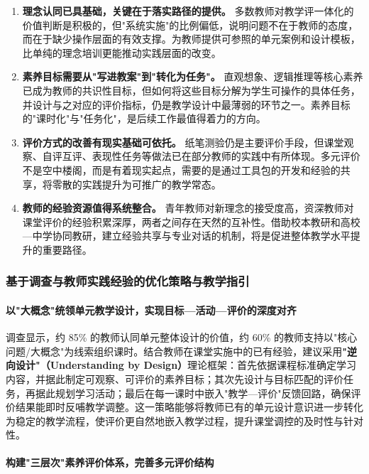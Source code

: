 \documentclass[UTF8,a4paper,12pt,twoside]{ctexart}
\begin{document}
\begin{enumerate}
\item \textbf{理念认同已具基础，关键在于落实路径的提供。} 多数教师对教学评一体化的价值判断是积极的，但"系统实施"的比例偏低，说明问题不在于教师的态度，而在于缺少操作层面的有效支撑。为教师提供可参照的单元案例和设计模板，比单纯的理念培训更能推动实践层面的改变。
\item \textbf{素养目标需要从"写进教案"到"转化为任务"。} 直观想象、逻辑推理等核心素养已成为教师的共识性目标，但如何将这些目标分解为学生可操作的具体任务，并设计与之对应的评价指标，仍是教学设计中最薄弱的环节之一。素养目标的"课时化"与"任务化"，是后续工作最值得着力的方向。
\item \textbf{评价方式的改善有现实基础可依托。} 纸笔测验仍是主要评价手段，但课堂观察、自评互评、表现性任务等做法已在部分教师的实践中有所体现。多元评价不是空中楼阁，而是有着现实起点，需要的是通过工具包的开发和经验的共享，将零散的实践提升为可推广的教学常态。
\item \textbf{教师的经验资源值得系统整合。} 青年教师对新理念的接受度高，资深教师对课堂评价的经验积累深厚，两者之间存在天然的互补性。借助校本教研和高校—中学协同教研，建立经验共享与专业对话的机制，将是促进整体教学水平提升的重要路径。
\end{enumerate}

\subsubsection{基于调查与教师实践经验的优化策略与教学指引}

\paragraph{以"大概念"统领单元教学设计，实现目标—活动—评价的深度对齐}

调查显示，约 85\% 的教师认同单元整体设计的价值，约 60\% 的教师支持以"核心问题/大概念"为线索组织课时。结合教师在课堂实施中的已有经验，建议采用\textbf{"逆向设计"（Understanding by Design）}理论框架：首先依据课程标准确定学习内容，并据此制定可观察、可评价的素养目标；其次先设计与目标匹配的评价任务，再据此规划学习活动；最后在每一课时中嵌入"教学—评价"反馈回路，确保评价结果能即时反哺教学调整。这一策略能够将教师已有的单元设计意识进一步转化为稳定的教学流程，使评价更自然地嵌入教学过程，提升课堂调控的及时性与针对性。

\paragraph{构建"三层次"素养评价体系，完善多元评价结构}
\end{document}
